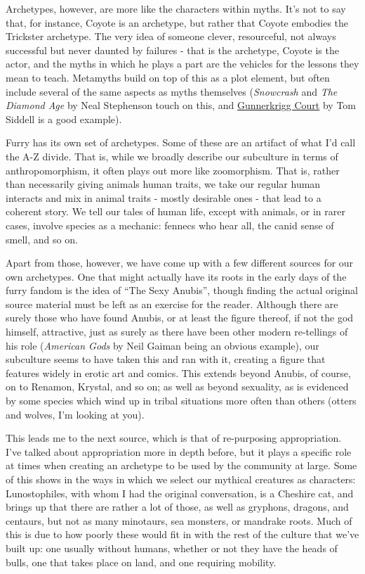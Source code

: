 Archetypes, however, are more like the characters within myths. It's not
to say that, for instance, Coyote is an archetype, but rather that
Coyote embodies the Trickster archetype. The very idea of someone
clever, resourceful, not always successful but never daunted by failures
- that is the archetype, Coyote is the actor, and the myths in which he
plays a part are the vehicles for the lessons they mean to teach.
Metamyths build on top of this as a plot element, but often include
several of the same aspects as myths themselves (\emph{Snowcrash} and
\emph{The Diamond Age} by Neal Stephenson touch on this, and
\href{http://www.gunnerkrigg.com/}{Gunnerkrigg Court} by Tom Siddell is
a good example).

Furry has its own set of archetypes. Some of these are an artifact of
what I'd call the A-Z divide. That is, while we broadly describe our
subculture in terms of anthropomorphism, it often plays out more like
zoomorphism. That is, rather than necessarily giving animals human
traits, we take our regular human interacts and mix in animal traits -
mostly desirable ones - that lead to a coherent story. We tell our tales
of human life, except with animals, or in rarer cases, involve species
as a mechanic: fennecs who hear all, the canid sense of smell, and so
on.

Apart from those, however, we have come up with a few different sources
for our own archetypes. One that might actually have its roots in the
early days of the furry fandom is the idea of ``The Sexy Anubis'',
though finding the actual original source material must be left as an
exercise for the reader. Although there are surely those who have found
Anubis, or at least the figure thereof, if not the god himself,
attractive, just as surely as there have been other modern re-tellings
of his role (\emph{American Gods} by Neil Gaiman being an obvious
example), our subculture seems to have taken this and ran with it,
creating a figure that features widely in erotic art and comics. This
extends beyond Anubis, of course, on to Renamon, Krystal, and so on; as
well as beyond sexuality, as is evidenced by some species which wind up
in tribal situations more often than others (otters and wolves, I'm
looking at you).

This leads me to the next source, which is that of re-purposing
appropriation. I've talked about appropriation more in depth before, but
it plays a specific role at times when creating an archetype to be used
by the community at large. Some of this shows in the ways in which we
select our mythical creatures as characters: Lunostophiles, with whom I
had the original conversation, is a Cheshire cat, and brings up that
there are rather a lot of those, as well as gryphons, dragons, and
centaurs, but not as many minotaurs, sea monsters, or mandrake roots.
Much of this is due to how poorly these would fit in with the rest of
the culture that we've built up: one usually without humans, whether or
not they have the heads of bulls, one that takes place on land, and one
requiring mobility.

